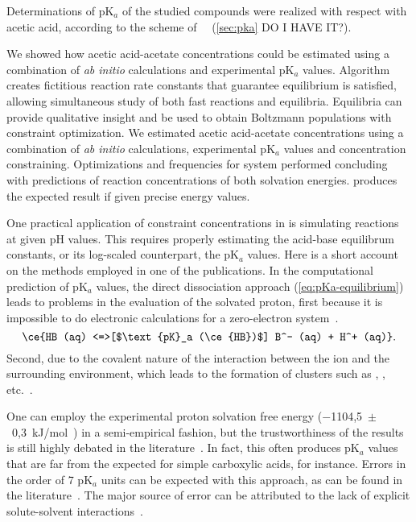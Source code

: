 %
\label{sec:pka}

Determinations of pK$_a$ of the studied compounds were realized with respect with acetic acid,
according to the scheme of~\citeauthor{Ding_2009}~\cite{Ding_2009} (\cref{sec:pka} DO I HAVE IT?).


We showed how
acetic acid-acetate concentrations could be estimated using a combination of \emph{ab initio} calculations and experimental pK$_a$ values.
Algorithm creates fictitious reaction rate constants that guarantee equilibrium is satisfied,
allowing simultaneous study of both fast reactions and equilibria.
Equilibria can provide qualitative insight and be used to obtain Boltzmann populations with constraint optimization.
We estimated acetic acid-acetate concentrations using a combination of \emph{ab initio} calculations,
experimental pK$_a$ values and  concentration constraining.
Optimizations and frequencies for  system performed concluding with predictions of reaction concentrations of both solvation energies.
\overreact{} produces the expected result if given precise energy values.

One practical application of constraint concentrations in \overreact{} is simulating reactions at given pH values.
This requires properly estimating the acid-base equilibrum constants, or its log-scaled counterpart, the pK$_a$ values.
Here is a short account on the methods employed in one of the publications. %
In the computational prediction of pK$_a$ values,
the direct dissociation approach (\cref{eq:pKa-equilibrium})
leads to problems in the evaluation of the solvated proton,
first because it is impossible to do electronic calculations for a zero-electron
system~\cite{Ding_2009,Sumon_2012}.
%
\begin{equation}
	\ce{HB (aq) <=>[$\text{pK}_a (\ce{HB})$] B^- (aq) + H^+ (aq)}\text{.}
	\label{eq:pKa-equilibrium}
\end{equation}
%
Second,
due to the covalent nature of the interaction between the  ion
and the surrounding environment,
which leads to the formation of clusters such
as ,
,
etc.~\cite{Sumon_2012}.

One can employ the experimental proton solvation free energy
($-$1104,5~$\pm$~0,3~kJ/mol~\cite{Tissandier_1998,Marenich_2009}) in a
semi-empirical fashion,
but the trustworthiness of the results is still highly
debated in the literature~\cite{Yang_2013}.
In fact,
this often produces pK$_a$ values that are far from the expected
for simple carboxylic acids,
for instance.
Errors in the order of 7 pK$_a$ units can be expected with this approach,
as can be found in the literature~\cite{Pliego_2002,Ding_2009}.
The major source of error can be attributed to the lack of explicit
solute-solvent interactions~\cite{Pliego_2002}.

